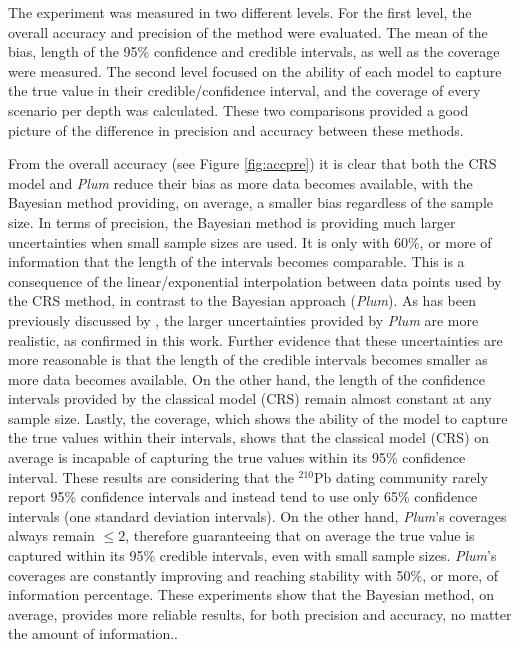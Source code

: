\documentclass [10pt] {article}
\begin{document}
The experiment was measured in two different levels.
For the first level, the overall accuracy and precision of the method were evaluated.
The mean of the bias, length of the 95\% confidence and credible intervals, as well as the coverage were measured.
The second level focused on the ability of each model to capture the true value in their credible/confidence interval, and the coverage of every scenario per depth was calculated. 
These two comparisons provided a good picture of the difference in precision and accuracy between these methods.

From the overall accuracy (see Figure \ref{fig:accpre}) it is clear that both the CRS model and \textit{Plum} reduce their bias as more data becomes available, with the Bayesian method providing, on average, a smaller bias regardless of the sample size. 
In terms of precision, the Bayesian method is providing much larger uncertainties when small sample sizes are used. 
It is only with 60\%, or more of information that the length of the intervals becomes comparable. 
This is a consequence of the linear/exponential interpolation between data points used by the CRS method, in contrast to the Bayesian approach (\textit{Plum}).  
As has been previously discussed by \citet{Aquino2020}, the larger uncertainties provided by \textit{Plum} are more realistic, as confirmed in this work.
Further evidence that these uncertainties are more reasonable is that the length of the credible intervals becomes smaller as more data becomes available. 
On the other hand, the length of the confidence intervals provided by the classical model (CRS) remain almost constant at any sample size.
Lastly, the coverage, which shows the ability of the model to capture the true values within their intervals, shows that the classical model (CRS) on average is incapable of capturing the true values within its 95\% confidence interval. 
These results are considering that the $^{210}$Pb dating community rarely report 95\% confidence intervals and instead tend to use only 65\% confidence intervals (one standard deviation intervals).
On the other hand, \textit{Plum}'s coverages always remain $\leq 2$, therefore guaranteeing that on average the true value is captured within its 95\% credible intervals, even with small sample sizes.
\textit{Plum}'s coverages are constantly improving and reaching stability with 50\%, or more, of information percentage.
These experiments show that the Bayesian method, on average, provides more reliable results, for both precision and accuracy, no matter the amount of information..
\end{document}
